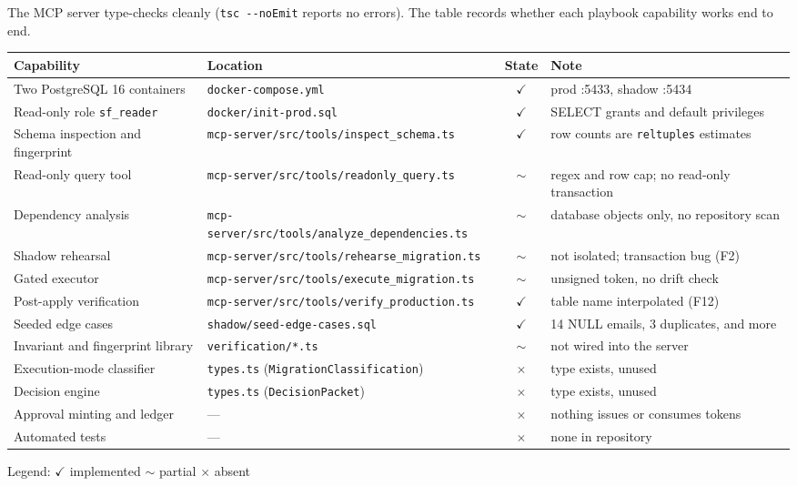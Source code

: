 \documentclass[11pt,a4paper]{article}
\newcommand{\fp}[1]{\nolinkurl{#1}}  %
\newcommand{\done}{\textcolor{sfgreen}{\ensuremath{\checkmark}}}
\newcommand{\wip}{\textcolor{sfamber}{\ensuremath{\sim}}}
\newcommand{\missing}{\textcolor{sfred}{\ensuremath{\times}}}
\begin{document}
The MCP server type-checks cleanly (\texttt{tsc -{}-noEmit} reports no errors). The table
records whether each playbook capability works end to end.

\begin{longtable}{@{}L{4.1cm}L{5.4cm}c L{4.6cm}@{}}
\toprule
\sffamily\bfseries Capability & \sffamily\bfseries Location & \sffamily\bfseries State & \sffamily\bfseries Note \\
\midrule
\endhead
Two PostgreSQL 16 containers & \fp{docker-compose.yml} & \done & prod :5433, shadow :5434 \\
Read-only role \fp{sf_reader} & \fp{docker/init-prod.sql} & \done & SELECT grants and default privileges \\
Schema inspection and fingerprint & \fp{mcp-server/src/tools/inspect_schema.ts} & \done & row counts are \fp{reltuples} estimates \\
Read-only query tool & \fp{mcp-server/src/tools/readonly_query.ts} & \wip & regex and row cap; no read-only transaction \\
Dependency analysis & \fp{mcp-server/src/tools/analyze_dependencies.ts} & \wip & database objects only, no repository scan \\
Shadow rehearsal & \fp{mcp-server/src/tools/rehearse_migration.ts} & \wip & not isolated; transaction bug (F2) \\
Gated executor & \fp{mcp-server/src/tools/execute_migration.ts} & \wip & unsigned token, no drift check \\
Post-apply verification & \fp{mcp-server/src/tools/verify_production.ts} & \done & table name interpolated (F12) \\
Seeded edge cases & \fp{shadow/seed-edge-cases.sql} & \done & 14 NULL emails, 3 duplicates, and more \\
Invariant and fingerprint library & \fp{verification/*.ts} & \wip & not wired into the server \\
Execution-mode classifier & \fp{types.ts} (\fp{MigrationClassification}) & \missing & type exists, unused \\
Decision engine & \fp{types.ts} (\fp{DecisionPacket}) & \missing & type exists, unused \\
Approval minting and ledger & --- & \missing & nothing issues or consumes tokens \\
Automated tests & --- & \missing & none in repository \\
\bottomrule
\end{longtable}

{\small Legend: \done{} implemented \quad \wip{} partial \quad \missing{} absent}
\end{document}
